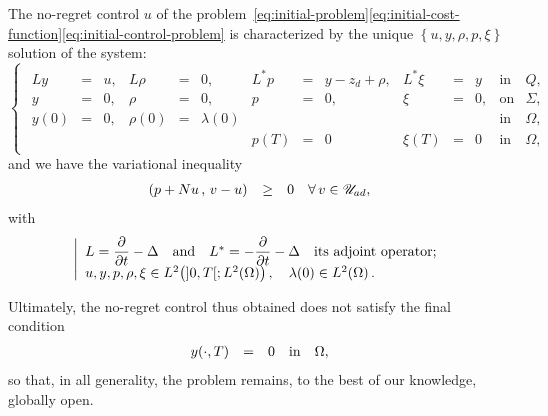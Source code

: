 \begin{theoreme}%
    The no-regret control $u$ of the
    problem~\eqref{eq:initial-problem}\eqref{eq:initial-cost-function}\eqref{eq:initial-control-problem}
    is characterized by the unique $\left\{{u,y,\rho,p,\xi}\right\}$
    solution of the system:
    \begin{equation}
        \begin{cases}\displaystyle
            \begin{array}{rclrclrclrclll}
                Ly & = & u, & L\rho & = & 0, & L^{*}p & = & y - z_{d} +
                \rho, & L^{*}\xi & = & y & \text{in} & Q,\\
                y & = & 0, & \rho & = & 0, & p & = & 0, & \xi & = & 0, &
                \text{on} & \Sigma,\\
                y(0) & = & 0, & \rho(0) & = & \lambda(0) & {} & {} & {} &
                {} & {} & {} & \text{in} & \Omega,\\
                {} & {} & {} & {} & {} & {} & p(T) & = & 0 & \xi(T) & = & 0
                & \text{in} & \Omega,
            \end{array}
        \end{cases}
    \end{equation}
    and we have the variational inequality
    \begin{equation}
        \begin{array}{rcll}
            {\left({ p + Nu\,,\,v - u }\right)}_{} & \geq & 0 & \forall\,v\in{\mathscr{U}}_{ad},
        \end{array}
    \end{equation}
    with
    \begin{equation*}
        \left|{%
            \begin{array}{l}
                L = \primetemps{} - \Delta\quad\text{and}\quad L^{*} =
                -\primetemps{} - \Delta\quad\text{its adjoint operator};\\
                u, y, p, \rho, \xi\in \Ldeux{]0,T[;\Ldeux{\Omega}},\quad
                \lambda(0)\in\Ldeux{\Omega}.
            \end{array}
        }\right.
    \end{equation*}
\end{theoreme}

Ultimately, the no-regret control thus obtained does not satisfy the final
condition
\begin{equation*}
    \begin{array}{rclll}
        {y}\!\left({\cdot,T}\right) & = & 0 & \text{in} & \Omega,
    \end{array}
\end{equation*}
so that, in all generality, the problem remains, to the best of our
knowledge, globally open.

